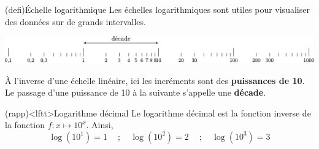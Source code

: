\documentclass[../../main/main.tex]{subfiles}
\begin{document}
\vspace{-10pt}
\begin{tcb}(defi){Échelle logarithmique}
	Les échelles logarithmiques sont utiles pour visualiser des données
	sur de grands intervalles.
	\smallbreak
	\noindent
	\begin{minipage}{\linewidth}
		\centering
		\includegraphics[width=\linewidth]{logscale}
		\label{fig:logscale}
	\end{minipage}
	À l'inverse d'une échelle linéaire, ici les incréments sont des
	\textbf{puissances de 10}. Le passage d'une puissance de 10 à la suivante
	s'appelle une \textbf{décade}.
\end{tcb}

\begin{tcb}(rapp)<lftt>{Logarithme décimal}
	Le logarithme décimal est la fonction inverse de la fonction $f:x\mapsto
		10^{x}$. Ainsi,
	\[
		\log(10^{1}) = 1
		\quad~; \quad
		\log (10^{2}) = 2
		\quad~; \quad
		\log (10^{3}) = 3
	\]
\end{tcb}
\end{document}
